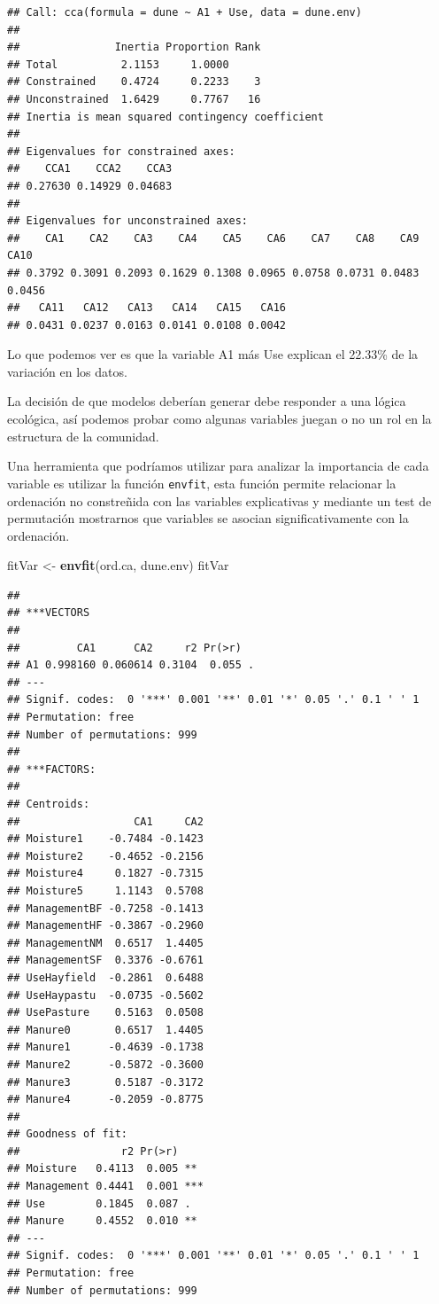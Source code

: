 \documentclass[]{book}
\newenvironment{Shaded}{\begin{snugshade}}{\end{snugshade}}
\newcommand{\KeywordTok}[1]{\textcolor[rgb]{0.13,0.29,0.53}{\textbf{{#1}}}}
\newcommand{\StringTok}[1]{\textcolor[rgb]{0.31,0.60,0.02}{{#1}}}
\newcommand{\NormalTok}[1]{{#1}}
\begin{document}
\begin{verbatim}
## Call: cca(formula = dune ~ A1 + Use, data = dune.env)
## 
##               Inertia Proportion Rank
## Total          2.1153     1.0000     
## Constrained    0.4724     0.2233    3
## Unconstrained  1.6429     0.7767   16
## Inertia is mean squared contingency coefficient 
## 
## Eigenvalues for constrained axes:
##    CCA1    CCA2    CCA3 
## 0.27630 0.14929 0.04683 
## 
## Eigenvalues for unconstrained axes:
##    CA1    CA2    CA3    CA4    CA5    CA6    CA7    CA8    CA9   CA10 
## 0.3792 0.3091 0.2093 0.1629 0.1308 0.0965 0.0758 0.0731 0.0483 0.0456 
##   CA11   CA12   CA13   CA14   CA15   CA16 
## 0.0431 0.0237 0.0163 0.0141 0.0108 0.0042
\end{verbatim}

Lo que podemos ver es que la variable A1 más Use explican el 22.33\% de
la variación en los datos.

La decisión de que modelos deberían generar debe responder a una lógica
ecológica, así podemos probar como algunas variables juegan o no un rol
en la estructura de la comunidad.

Una herramienta que podríamos utilizar para analizar la importancia de
cada variable es utilizar la función \texttt{envfit}, esta función
permite relacionar la ordenación no constreñida con las variables
explicativas y mediante un test de permutación mostrarnos que variables
se asocian significativamente con la ordenación.

\begin{Shaded}
\begin{Highlighting}[]
\NormalTok{fitVar <-}\StringTok{ }\KeywordTok{envfit}\NormalTok{(ord.ca, dune.env)}
\NormalTok{fitVar}
\end{Highlighting}
\end{Shaded}

\begin{verbatim}
## 
## ***VECTORS
## 
##         CA1      CA2     r2 Pr(>r)  
## A1 0.998160 0.060614 0.3104  0.055 .
## ---
## Signif. codes:  0 '***' 0.001 '**' 0.01 '*' 0.05 '.' 0.1 ' ' 1
## Permutation: free
## Number of permutations: 999
## 
## ***FACTORS:
## 
## Centroids:
##                  CA1     CA2
## Moisture1    -0.7484 -0.1423
## Moisture2    -0.4652 -0.2156
## Moisture4     0.1827 -0.7315
## Moisture5     1.1143  0.5708
## ManagementBF -0.7258 -0.1413
## ManagementHF -0.3867 -0.2960
## ManagementNM  0.6517  1.4405
## ManagementSF  0.3376 -0.6761
## UseHayfield  -0.2861  0.6488
## UseHaypastu  -0.0735 -0.5602
## UsePasture    0.5163  0.0508
## Manure0       0.6517  1.4405
## Manure1      -0.4639 -0.1738
## Manure2      -0.5872 -0.3600
## Manure3       0.5187 -0.3172
## Manure4      -0.2059 -0.8775
## 
## Goodness of fit:
##                r2 Pr(>r)    
## Moisture   0.4113  0.005 ** 
## Management 0.4441  0.001 ***
## Use        0.1845  0.087 .  
## Manure     0.4552  0.010 ** 
## ---
## Signif. codes:  0 '***' 0.001 '**' 0.01 '*' 0.05 '.' 0.1 ' ' 1
## Permutation: free
## Number of permutations: 999
\end{verbatim}
\end{document}
